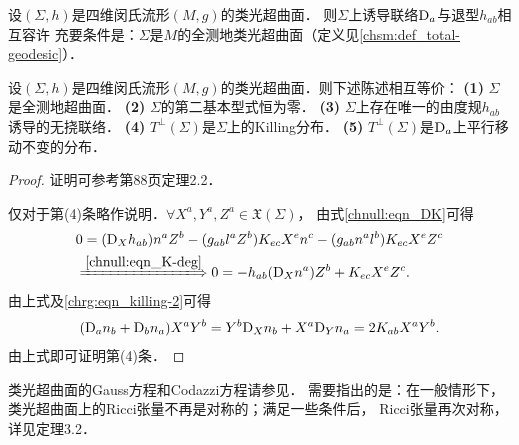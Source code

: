 \begin{proposition}
    设$(\Sigma,h)$是四维闵氏流形$(M,g)$的类光超曲面．
    则$\Sigma$上诱导联络${\rm D}_a$与退型$h_{ab}$相互容许
    充要条件是：$\Sigma$是$M$的全测地类光超曲面（定义见\ref{chsm:def_total-geodesic}）．
\end{proposition}


\begin{proposition}
    设$(\Sigma,h)$是四维闵氏流形$(M,g)$的类光超曲面．则下述陈述相互等价：    
    {\bfseries (1)} $\Sigma$是全测地超曲面．    
    {\bfseries (2)} $\Sigma$的第二基本型式恒为零．    
    {\bfseries (3)} $\Sigma$上存在唯一的由度规$h_{ab}$诱导的无挠联络．    
    {\bfseries (4)} $T^\perp(\Sigma)$是$\Sigma$上的Killing分布．    
    {\bfseries (5)} $T^\perp(\Sigma)$是${\rm D}_a$上平行移动不变的分布．
\end{proposition}

\begin{proof}
    证明可参考\parencite{Duggal-Bejancu-1996}第88页定理2.2．

仅对于第(4)条略作说明．$\forall X^a,Y^a,Z^a \in \mathfrak{X}(\Sigma)$，
由式\eqref{chnull:eqn_DK}可得
\begin{align}
    &0=({\rm D}_{X}h_{ab}) n^a Z^b
    -(g_{ab} l^a Z^b) K_{ec}  X^e n^c   - (g_{ab}n^a l^b) K_{ec}  X^e Z^c 
     \notag \\
    &\xLongrightarrow{\ref{chnull:eqn_K-deg}} 
    0= - h_{ab} ({\rm D}_X n^a) Z^b + K_{ec}  X^e Z^c .
\end{align}
由上式及\eqref{chrg:eqn_killing-2}可得
\begin{align}
    ({\rm D}_a n_b + {\rm D}_b n_a ) X^a Y^b
    =Y^b {\rm D}_X n_b + X^a {\rm D}_Y n_a 
    =2 K_{ab} X^a Y^b.
\end{align}
由上式即可证明第(4)条．
\end{proof}




类光超曲面的Gauss方程和Codazzi方程请参见\parencite[\S 4.3]{Duggal-Bejancu-1996}．
需要指出的是：在一般情形下，类光超曲面上的Ricci张量不再是对称的；满足一些条件后，
Ricci张量再次对称，详见\parencite[\S 4.3]{Duggal-Bejancu-1996}定理3.2．


